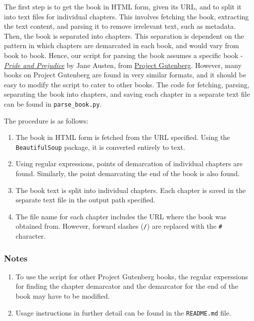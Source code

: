 \documentclass{article}
\begin{document}
\begin{flushleft}
The first step is to get the book in HTML form, given its URL, and to split it into text files for individual chapters. This involves fetching the book, extracting the text content, and parsing it to remove irrelevant text, such as metadata. Then, the book is separated into chapters. This separation is dependent on the pattern in which chapters are demarcated in each book, and would vary from book to book. Hence, our script for parsing the book assumes a specific book - \textit{\href{https://www.gutenberg.org/files/1342/1342-h/1342-h.htm}{Pride and Prejudice}} by Jane Austen, from \href{https://www.gutenberg.org}{Project Gutenberg}. However, many books on Project Gutenberg are found in very similar formats, and it should be easy to modify the script to cater to other books. The code for fetching, parsing, separating the book into chapters, and saving each chapter in a separate text file can be found in \verb|parse_book.py|.

The procedure is as follows:
\begin{enumerate}
	\item The book in HTML form is fetched from the URL specified. Using the \verb|BeautifulSoup| package, it is converted entirely to text.
	\item Using regular expressions, points of demarcation of individual chapters are found. Similarly, the point demarcating the end of the book is also found.
	\item The book text is split into individual chapters. Each chapter is saved in the separate text file in the output path specified.
	\item The file name for each chapter includes the URL where the book was obtained from. However, forward slashes (\verb|/|) are replaced with the \verb|#| character.
\end{enumerate}

\subsubsection*{Notes}
\begin{enumerate}
	\item To use the script for other Project Gutenberg books, the regular experssions for finding the chapter demarcator and the demarcator for the end of the book may have to be modified.
	\item Usage instructions in further detail can be found in the \verb|README.md| file.
\end{enumerate}
\end{flushleft}
\newpage
\end{document}
